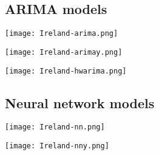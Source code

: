 \subsection{ARIMA models}

\texttt{[image: Ireland-arima.png]}

\texttt{[image: Ireland-arimay.png]}

\texttt{[image: Ireland-hwarima.png]}


\subsection{Neural network models}

\texttt{[image: Ireland-nn.png]}

\texttt{[image: Ireland-nny.png]}
